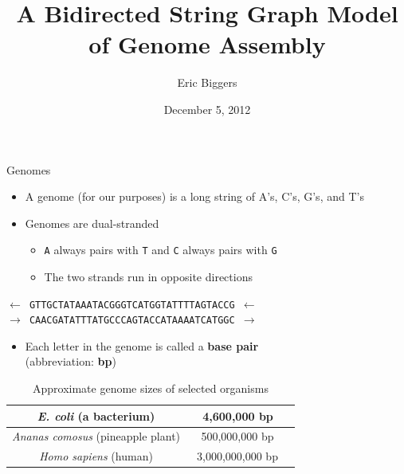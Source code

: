 \documentclass[xcolor=dvipsnames]{beamer}
\begin{document}
\title{A Bidirected String Graph Model of Genome Assembly}
\author{Eric Biggers}
\date{December 5, 2012}


\frame{\titlepage}

\begin{frame}{Genomes}
	\begin{itemize}
		\item A genome (for our purposes) is a long string of A's, C's, G's, and T's
		\item Genomes are dual-stranded
		\begin{itemize}
			\item {\tt A} always pairs with {\tt T} and {\tt C} always pairs
			with {\tt G}
			\item The two strands run in opposite directions
		\end{itemize}
	\end{itemize}
	\begin{center}
	{\tt $\leftarrow$ GTTGCTATAAATACGGGTCATGGTATTTTAGTACCG $\leftarrow$ \\}
	{\tt $\rightarrow$ CAACGATATTTATGCCCAGTACCATAAAATCATGGC $\rightarrow$}
	\end{center}
	\begin{itemize}
		\item Each letter in the genome is called a {\bf base pair} \\(abbreviation:
		{\bf bp})
	\end{itemize}
	\begin{table}[H]
		\caption{Approximate genome sizes of selected organisms}
		\begin{tabular}{|c|c|c|}
			\hline
			{\it E. coli} (a bacterium) &  ~4,600,000 bp \\
			\hline
			{\it Ananas comosus} (pineapple plant) &	~500,000,000 bp \\
			\hline
			{\it Homo sapiens} (human)       &  ~3,000,000,000 bp \\
			\hline
		\end{tabular}
	\end{table}
\end{frame}
\end{document}
